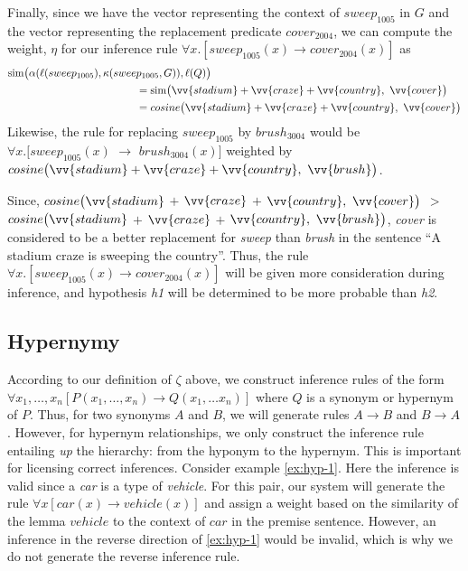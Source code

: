 Finally, since we have the vector representing the context of $sweep_{1005}$ in
$G$ and the vector representing the replacement predicate $cover_{2004}$, we can
compute the weight, $\eta$ for our inference rule $\forall x.[sweep_{1005}(x)
\to cover_{2004}(x)]$ as
\begin{align*}
& \simfunc\big(\alpha(\ell(sweep_{1005}), \kappa(sweep_{1005}, G)), \ell(Q)\big) \\
& \hspace{120px} = \simfunc\big(\vv{stadium} + \vv{craze} + \vv{country},~ \vv{cover}\big) \\
& \hspace{120px} = cosine\big(\vv{stadium} + \vv{craze} + \vv{country},~ \vv{cover}\big)
\end{align*}
Likewise, the rule for replacing $sweep_{1005}$ by $brush_{3004}$ would be 
$\forall x.[sweep_{1005}(x)$ $\to$ $brush_{3004}(x)]$ weighted by 
$cosine\big(\vv{stadium} + \vv{craze} + \vv{country},~ \vv{brush}\big)$.

Since, $cosine\big(\vv{stadium}$ $+$ $\vv{craze}$ $+$ $\vv{country},~
\vv{cover}\big)$ $>$ $cosine\big(\vv{stadium}$ $+$ $\vv{craze}$ $+$ $\vv{country},~
\vv{brush}\big)$, {\it cover} is considered to be a better replacement for {\it
sweep} than {\it brush} in the sentence ``A stadium craze is sweeping the
country''.  Thus, the rule $\forall x.[sweep_{1005}(x) \to cover_{2004}(x)]$
will be given more consideration during inference, and hypothesis {\it h1} will
be determined to be more probable than {\it h2}.




\subsection*{Hypernymy}

According to our definition of $\zeta$ above, we construct inference rules of
the form $\forall x_1, \ldots, x_n[ P(x_1, \ldots, x_n) \to Q(x_1, \ldots x_n)
]$ where $Q$ is a synonym or hypernym of $P$.  Thus, for two synonyms $A$ and
$B$, we will generate rules $A \to B$ and $B \to A$.  However, for hypernym
relationships, we only construct the inference rule entailing {\it up} the
hierarchy: from the hyponym to the hypernym.  This is important for licensing
correct inferences.  Consider example \eqref{ex:hyp-1}.
Here the inference is valid since a {\it car} is a type of {\it vehicle}. 
For this pair, our system will generate the rule $\forall x[car(x) \to
vehicle(x)]$ and assign a weight based on the similarity of the lemma $vehicle$
to the context of $car$ in the premise sentence.  However, an inference in the
reverse direction of \eqref{ex:hyp-1} would be invalid, which is why we do not
generate the reverse inference rule.


